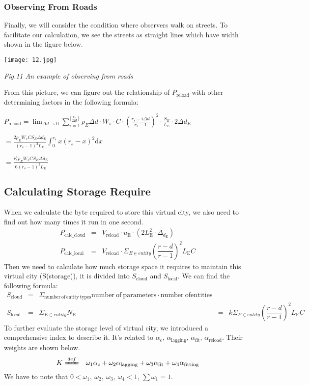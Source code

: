 \documentclass[12pt]{article}
\theoremstyle{definition}
\theoremstyle{remark}
\numberwithin{equation}{section}
\begin{document}
		\subsubsection{Observing From Roads}
		Finally, we will consider the condition where observers walk on streets. To facilitate our calculation, we see the streets as straight lines which have width shown in the figure below.
		
		\begin{center}
			\texttt{[image: 12.jpg]}
			
			\textit{Fig.11 An example of observing from roads}
		\end{center}
		
		From this picture, we can figure out the relationship of $P_\mathrm{reload}$ with other determining factors in the following formula:
		
		$
		P_{\mathrm{reload}}=\lim_{\Delta d\rightarrow 0} \sum_{i=1}^{\lfloor \frac{r_s}{\Delta d} \rfloor}{\rho _E\Delta d\cdot W_s\cdot C\cdot \left( \frac{r_s-i\Delta d}{r_s-1} \right) ^2\cdot \frac{S_E}{L_E}\cdot 2\Delta d_E}
		$
		
		$
		=\frac{2\rho _EW_sCS_E\Delta d_E}{\left( r_s-1 \right) ^2L_E}\int_0^{r_s}{x\left( r_s-x \right) ^2\mathrm{d}x}
		$
		
		$
		=\frac{r_{s}^{4}\rho _EW_sCS_E\Delta d_E}{6\left( r_s-1 \right) ^2L_E}
		$
		\subsection{Calculating Storage Require}
		When we calculate the byte required to store this virtual city, we also need to find out how many times it run in one second. 
		\begin{align}
			P_\mathrm{calc\_cloud}&=&V_\mathrm{reload}\cdot u_\mathrm{E}\cdot\left(2L_\mathrm{E}^2\cdot \Delta_{d_\mathrm{E}}\right)\\
			P_\mathrm{calc\_local}&=&V_\mathrm{reload}\cdot\Sigma_{E \in entity}\left(\dfrac{r-d}{r-1}\right)^2 L_\mathrm{E} C
		\end{align}
		Then we need to calculate how much storage space it requires to maintain this virtual city (S(storage)), it is divided into $S_\mathrm{cloud}$ and $S_\mathrm{local}$. We can find the following formula:
		\begin{align}
			S_\mathrm{cloud}&=&\Sigma_\mathrm{number\ of\ entity\ types} \mathrm{number\ of\ parameters} \cdot \mathrm{number\ of entities}\\
			S_\mathrm{local}&=&\Sigma_{E \in entity} N_\mathrm{E}&=&k\Sigma_{E \in entity}\left(\dfrac{r-d}{r-1}\right)^2 L_\mathrm{E} C
		\end{align}
		To further evaluate the storage level of virtual city, we introduced a comprehensive index to describe it. It's related to $\alpha_\mathrm{c}$, $\alpha_\mathrm{lagging}$, $\alpha_\mathrm{fit}$, $\alpha_\mathrm{reload}$. Their weights are shown below.
		\begin{align}
			K&\xlongequal{def}&\omega_1\alpha_\mathrm{c}+\omega_2\alpha_\mathrm{lagging}+\omega_3\alpha_\mathrm{fit}+\omega_4\alpha_\mathrm{fitting}
		\end{align}
		We have to note that $0<\omega_1,~\omega_2,~\omega_3,~\omega_4<1$, $\sum{\omega_1}=1$.
\end{document}
